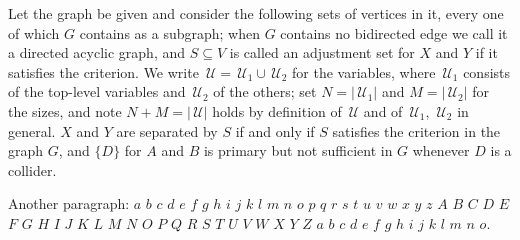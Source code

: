 \documentclass{article}
\newcommand{\cU}{\,\mathcal{U}}
\begin{document}
Let the graph be given and consider the following sets of vertices in it, every one of which
$G$ contains as a subgraph; when $G$ contains no bidirected edge we call it a directed acyclic
graph, and $S\subseteq V$ is called an adjustment set for $X$ and $Y$ if it satisfies the
criterion. We write $\cU = \cU_1 \cup \cU_2$ for the variables, where $\cU_1$ consists of the
top-level variables and $\cU_2$ of the others; set $N = |\cU_1|$ and $M = |\cU_2|$ for the
sizes, and note $N+M = |\cU|$ holds by definition of $\cU$ and of $\cU_1$, $\cU_2$ in general.
$X$ and $Y$ are separated by $S$ if and only if $S$ satisfies the criterion in the graph $G$,
and $\{D\}$ for $A$ and $B$ is primary but not sufficient in $G$ whenever $D$ is a collider.

Another paragraph: $a$ $b$ $c$ $d$ $e$ $f$ $g$ $h$ $i$ $j$ $k$ $l$ $m$ $n$ $o$ $p$ $q$ $r$ $s$
$t$ $u$ $v$ $w$ $x$ $y$ $z$ $A$ $B$ $C$ $D$ $E$ $F$ $G$ $H$ $I$ $J$ $K$ $L$ $M$ $N$ $O$ $P$ $Q$
$R$ $S$ $T$ $U$ $V$ $W$ $X$ $Y$ $Z$ $a$ $b$ $c$ $d$ $e$ $f$ $g$ $h$ $i$ $j$ $k$ $l$ $m$ $n$ $o$.
\end{document}
